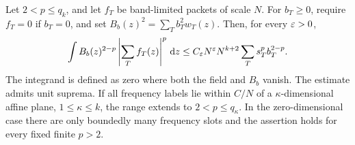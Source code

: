 \begin{proposition}\label{p:weighted}
Let $2<p\leq q_k$, and let $f_T$ be band-limited packets of scale $N$.
For $b_T\geq0$, require $f_T=0$ if $b_T=0$, and set
$B_b(z)^2=\sum_Tb_T^2w_T(z)$.  Then, for every $\varepsilon>0$,
\begin{equation}\label{p:weighted-equation}
 \int B_b(z)^{2-p}\left|\sum_Tf_T(z)\right|^p\,\mathrm d z
 \leq C_\varepsilon N^\varepsilon N^{k+2}\sum_Ts_T^p b_T^{2-p}.
\end{equation}
The integrand is defined as zero where both the field and $B_b$ vanish.
The estimate admits unit suprema.  If all frequency labels lie within
$C/N$ of a $\kappa$-dimensional affine plane, $1\leq\kappa\leq k$, the
range extends to $2<p\leq q_\kappa$.  In the zero-dimensional case there
are only boundedly many frequency slots and the assertion holds for every
fixed finite $p>2$.
\end{proposition}
